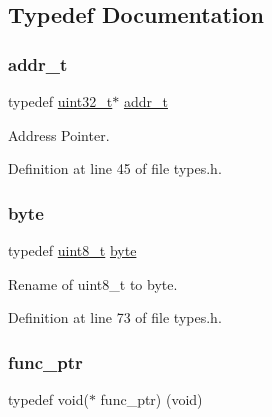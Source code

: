 \subsection{Typedef Documentation}
\mbox{\label{a00134_a295f71165288684c38c6bb836fbb3c59_a295f71165288684c38c6bb836fbb3c59}} 
\subsubsection{\texorpdfstring{addr\+\_\+t}{addr\_t}}
{\footnotesize\ttfamily typedef \hyperlink{a00134_a435d1572bf3f880d55459d9805097f62_a435d1572bf3f880d55459d9805097f62}{uint32\+\_\+t}$\ast$ \hyperlink{a00134_a295f71165288684c38c6bb836fbb3c59_a295f71165288684c38c6bb836fbb3c59}{addr\+\_\+t}}



Address Pointer. 



Definition at line 45 of file types.\+h.

\mbox{\label{a00134_ab8ef12fab634c171394422d0ee8baf94_ab8ef12fab634c171394422d0ee8baf94}} 
\subsubsection{\texorpdfstring{byte}{byte}}
{\footnotesize\ttfamily typedef \hyperlink{a00134_aba7bc1797add20fe3efdf37ced1182c5_aba7bc1797add20fe3efdf37ced1182c5}{uint8\+\_\+t} \hyperlink{a00134_ab8ef12fab634c171394422d0ee8baf94_ab8ef12fab634c171394422d0ee8baf94}{byte}}



Rename of uint8\+\_\+t to byte. 



Definition at line 73 of file types.\+h.

\mbox{\label{a00134_a3c06233410074f1dbb8b3eebef3a7847_a3c06233410074f1dbb8b3eebef3a7847}} 
\subsubsection{\texorpdfstring{func\+\_\+ptr}{func\_ptr}}
{\footnotesize\ttfamily typedef void($\ast$ func\+\_\+ptr) (void)}



